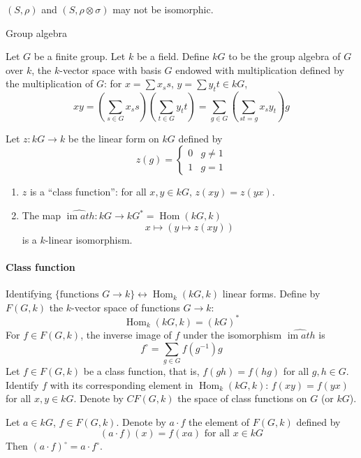 \documentclass[11pt, a4paper]{report}
\begin{document}
\begin{remark}
$(S, \rho)$ and $(S, \rho \otimes \sigma)$ may not be isomorphic.
\end{remark}

\begin{definition}
Group algebra

Let $G$ be a finite group. Let $k$ be a field. Define $k G$ to be the group algebra of $G$ over $k$, the $k$-vector space with basis $G$ endowed with multiplication defined by the multiplication of $G$: for $x = \sum x_{s} s$, $y = \sum y_{t} t \in k G$,
\[
xy = \left(\sum_{s \in G} x_{s} s\right)\left(\sum_{t \in G} y_{t} t\right) = \sum_{g \in G}\left(\sum_{st = g} x_{s} y_{t}\right) g
\]
\end{definition}

\begin{lemma}
Let $z: k G \rightarrow k$ be the linear form on $k G$ defined by
\[
z(g) = \begin{cases} 0 & g \neq 1 \\ 1 & g = 1 \end{cases}
\]
\begin{enumerate}
\item $z$ is a ``class function'': for all $x, y \in k G$, $z(xy) = z(yx)$.
\item The map $\hat{\operatorname{im}ath}: k G \rightarrow k G^{*} = \operatorname{Hom}(k G, k)$
\[
x \mapsto (y \mapsto z(xy))
\]
is a $k$-linear isomorphism.
\end{enumerate}
\end{lemma}

\paragraph{Class function}

Identifying $\{ \text{functions } G \rightarrow k \} \longleftrightarrow \operatorname{Hom}_{k}(k G, k)$ linear forms. Define by $F(G, k)$ the $k$-vector space of functions $G \rightarrow k$:
\[
\operatorname{Hom}_{k}(k G, k) = (k G)^{*}
\]
For $f \in F(G, k)$, the inverse image of $f$ under the isomorphism $\hat{\operatorname{im}ath}$ is
\[
f^{\circ} = \sum_{g \in G} f(g^{-1}) g
\]
Let $f \in F(G, k)$ be a class function, that is, $f(gh) = f(hg)$ for all $g, h \in G$. Identify $f$ with its corresponding element in $\operatorname{Hom}_{k}(k G, k)$: $f(xy) = f(yx)$ for all $x, y \in k G$. Denote by $CF(G, k)$ the space of class functions on $G$ (or $k G$).

\begin{remark}
Let $a \in k G$, $f \in F(G, k)$. Denote by $a \cdot f$ the element of $F(G, k)$ defined by
\[
(a \cdot f)(x) = f(xa) \text{ for all } x \in k G
\]
Then $(a \cdot f)^{\circ} = a \cdot f^{\circ}$.
\end{remark}
\end{document}
